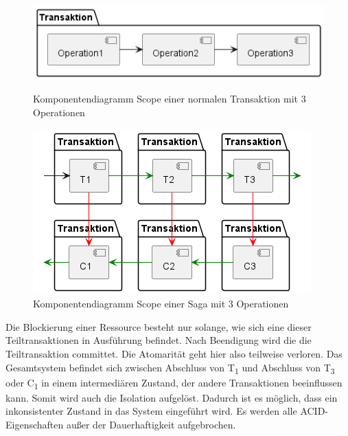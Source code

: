 \begin{figure}[!htbp]
	\begin{minipage}{.45\textwidth}
		\includegraphics[width=\linewidth]{figures/ChapterSaga/TransactionScopeNormal-0.png}
		\caption{\small Komponentendiagramm Scope einer normalen Transaktion mit 3 Operationen}
		\label{fig:transactionscope-normal}
	\end{minipage}\hspace{\fill}%
	\begin{minipage}{.45\textwidth}
		\includegraphics[width=\linewidth]{figures/ChapterSaga/TransactionScopeSaga-0.png}
		\caption{\small Komponentendiagramm Scope einer Saga mit 3 Operationen}
		\label{fig:transactionscope-saga}
	\end{minipage}
\end{figure}
\FloatBarrier

Die Blockierung einer Ressource besteht nur solange, wie sich eine dieser Teiltransaktionen in Ausführung befindet. Nach Beendigung wird die die Teiltransaktion committet. Die Atomarität geht hier also teilweise verloren. Das Gesamtsystem befindet sich zwischen Abschluss von T\textsubscript{1} und Abschluss von T\textsubscript{3} oder C\textsubscript{1} in einem intermediären Zustand, der andere Transaktionen beeinflussen kann. Somit wird auch die Isolation aufgelöst. Dadurch ist es möglich, dass ein inkonsistenter Zustand in das System eingeführt wird. Es werden alle ACID-Eigenschaften außer der Dauerhaftigkeit aufgebrochen.


